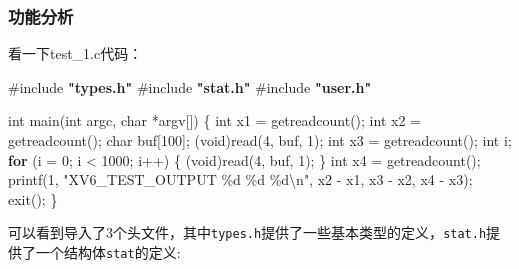 \documentclass{article}
\newenvironment{Shaded}{}{}
\newcommand{\ControlFlowTok}[1]{\textcolor[rgb]{0.00,0.44,0.13}{\textbf{#1}}}
\newcommand{\DataTypeTok}[1]{\textcolor[rgb]{0.56,0.13,0.00}{#1}}
\newcommand{\DecValTok}[1]{\textcolor[rgb]{0.25,0.63,0.44}{#1}}
\newcommand{\ImportTok}[1]{\textcolor[rgb]{0.00,0.50,0.00}{\textbf{#1}}}
\newcommand{\NormalTok}[1]{#1}
\newcommand{\OperatorTok}[1]{\textcolor[rgb]{0.40,0.40,0.40}{#1}}
\newcommand{\PreprocessorTok}[1]{\textcolor[rgb]{0.74,0.48,0.00}{#1}}
\newcommand{\SpecialCharTok}[1]{\textcolor[rgb]{0.25,0.44,0.63}{#1}}
\newcommand{\StringTok}[1]{\textcolor[rgb]{0.25,0.44,0.63}{#1}}
\begin{document}
\subsubsection{功能分析}\label{ux529fux80fdux5206ux6790}

看一下test\_1.c代码：

\begin{Shaded}
  \begin{Highlighting}[]
    \PreprocessorTok{\#include }\ImportTok{"types.h"}
    \PreprocessorTok{\#include }\ImportTok{"stat.h"}
    \PreprocessorTok{\#include }\ImportTok{"user.h"}

    \DataTypeTok{int}\NormalTok{ main}\OperatorTok{(}\DataTypeTok{int}\NormalTok{ argc}\OperatorTok{,} \DataTypeTok{char} \OperatorTok{*}\NormalTok{argv}\OperatorTok{[])}
    \OperatorTok{\{}
    \DataTypeTok{int}\NormalTok{ x1 }\OperatorTok{=}\NormalTok{ getreadcount}\OperatorTok{();}
    \DataTypeTok{int}\NormalTok{ x2 }\OperatorTok{=}\NormalTok{ getreadcount}\OperatorTok{();}
    \DataTypeTok{char}\NormalTok{ buf}\OperatorTok{[}\DecValTok{100}\OperatorTok{];}
    \OperatorTok{(}\DataTypeTok{void}\OperatorTok{)}\NormalTok{read}\OperatorTok{(}\DecValTok{4}\OperatorTok{,}\NormalTok{ buf}\OperatorTok{,} \DecValTok{1}\OperatorTok{);}
    \DataTypeTok{int}\NormalTok{ x3 }\OperatorTok{=}\NormalTok{ getreadcount}\OperatorTok{();}
    \DataTypeTok{int}\NormalTok{ i}\OperatorTok{;}
    \ControlFlowTok{for} \OperatorTok{(}\NormalTok{i }\OperatorTok{=} \DecValTok{0}\OperatorTok{;}\NormalTok{ i }\OperatorTok{\textless{}} \DecValTok{1000}\OperatorTok{;}\NormalTok{ i}\OperatorTok{++)}
    \OperatorTok{\{}
    \OperatorTok{(}\DataTypeTok{void}\OperatorTok{)}\NormalTok{read}\OperatorTok{(}\DecValTok{4}\OperatorTok{,}\NormalTok{ buf}\OperatorTok{,} \DecValTok{1}\OperatorTok{);}
    \OperatorTok{\}}
    \DataTypeTok{int}\NormalTok{ x4 }\OperatorTok{=}\NormalTok{ getreadcount}\OperatorTok{();}
    \NormalTok{  printf}\OperatorTok{(}\DecValTok{1}\OperatorTok{,} \StringTok{"XV6\_TEST\_OUTPUT }\SpecialCharTok{\%d}\StringTok{ }\SpecialCharTok{\%d}\StringTok{ }\SpecialCharTok{\%d\textbackslash{}n}\StringTok{"}\OperatorTok{,}\NormalTok{ x2 }\OperatorTok{{-}}\NormalTok{ x1}\OperatorTok{,}\NormalTok{ x3 }\OperatorTok{{-}}\NormalTok{ x2}\OperatorTok{,}\NormalTok{ x4 }\OperatorTok{{-}}\NormalTok{ x3}\OperatorTok{);}
    \NormalTok{  exit}\OperatorTok{();}
    \OperatorTok{\}}
  \end{Highlighting}
\end{Shaded}

可以看到导入了3个头文件，其中\texttt{types.h}提供了一些基本类型的定义，\texttt{stat.h}提供了一个结构体\texttt{stat}的定义:
\end{document}
